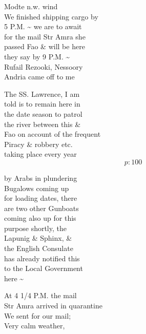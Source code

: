 \documentclass{report}
\begin{document}
	\par{
 	Modte n.w. wind\ \\We finished shipping cargo by\ \\5 P.M. \~{} we are to await\ \\for the mail Str Amra she\ \\passed Fao \& will be here\ \\they say by 9 P.M. \~{}\ \\Rufail Rezooki, Nessoory\ \\Andria came off to me\ \\
	}

	\par{
 	The SS. Lawrence, I am\ \\told is to remain here in\ \\the date season to patrol\ \\the river between this \&\ \\Fao on account of the frequent\ \\Piracy \& robbery etc.\ \\taking place every year\ \\
  \[p: 100 \]

	}





	\par{
 	by Arabs in plundering\ \\Bugalows coming up\ \\for loading dates, there\ \\are two other Gunboats\ \\coming also up for this\ \\purpose shortly, the\ \\Lapunig \& Sphinx, \&\ \\the English Consulate\ \\has already notified this\ \\to the Local Government\ \\here \~{}\ \\
	}

	\par{
 	At 4 1/4 P.M. the mail\ \\Str Amra arrived in quarantine\ \\We sent for our mail;\ \\Very calm weather,\ \\
	}
\end{document}

